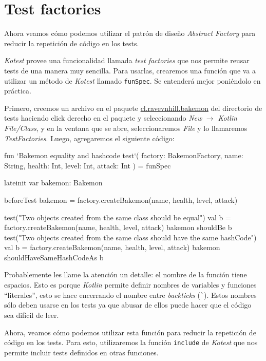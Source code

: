 \section{Test factories}
\label{sec:test-factories}
  Ahora veamos cómo podemos utilizar el patrón de diseño \textit{Abstract Factory} para reducir la
  repetición de código en los tests.

  \textit{Kotest} provee una funcionalidad llamada \textit{test factories} que nos permite
  reusar tests de una manera muy sencilla.
  Para usarlas, crearemos una función que va a utilizar un método de \textit{Kotest} llamado
  \texttt{funSpec}.
  Se entenderá mejor poniéndolo en práctica.

  Primero, creemos un archivo en el paquete \url{cl.ravevnhill.bakemon} del directorio de tests 
  haciendo click derecho en el paquete y seleccionando \textit{New} \(\rightarrow\) 
  \textit{Kotlin File/Class}, y en la ventana que se abre, seleccionaremos \textit{File} y
  lo llamaremos \textit{TestFactories}.
  Luego, agregaremos el siguiente código:

  \begin{kotlin}
    fun `Bakemon equality and hashcode test`(
      factory: BakemonFactory,
      name: String,
      health: Int,
      level: Int,
      attack: Int
    ) = funSpec {
      lateinit var bakemon: Bakemon

      beforeTest {
        bakemon = factory.createBakemon(name, health, level, attack)
      }

      test("Two objects created from the same class should be equal") {
        val b = factory.createBakemon(name, health, level, attack)
        bakemon shouldBe b
      }
      test("Two objects created from the same class should have the same hashCode") {
        val b = factory.createBakemon(name, health, level, attack)
        bakemon shouldHaveSameHashCodeAs b
      }
    }
  \end{kotlin}

  Probablemente les llame la atención un detalle: el nombre de la función tiene espacios.
  Esto es porque \textit{Kotlin} permite definir nombres de variables y funciones 
  \enquote{literales}, esto se hace encerrando el nombre entre \textit{backticks} (\texttt{\`{}}).
  Estos nombres sólo deben usarse en los tests\autocite{CodingConventionsKotlin} ya que abusar de
  ellos puede hacer que el código sea difícil de leer.

  Ahora, veamos cómo podemos utilizar esta función para reducir la repetición de código en los 
  tests.
  Para esto, utilizaremos la función \texttt{include} de \textit{Kotest} que nos permite incluir
  tests definidos en otras funciones.

